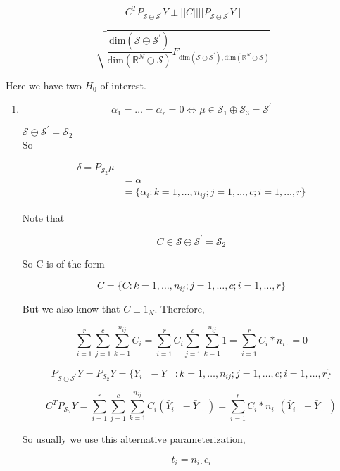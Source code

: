 \documentclass[11pt,fleqn]{book} %
\begin{document}
		$$C^T P_{\mathcal{S} \ominus \mathcal{S}^\prime} Y \pm ||C|| ||P_{\mathcal{S} \ominus \mathcal{S}^\prime}Y|| $$

		$$\sqrt{ \frac{\text{dim}(\mathcal{S} \ominus \mathcal{S}^\prime)}{\text{dim}(\mathbb{R}^N \ominus \mathcal{S})} F_{\text{dim}(\mathcal{S} \ominus \mathcal{S}^\prime), \text{dim}(\mathbb{R}^N \ominus \mathcal{S})} } $$


Here we have two $H_0 $ of interest. 

	\begin{enumerate}[label = \Roman*]
		\item $$\alpha_1 = \dots = \alpha _r = 0 \Leftrightarrow \mu \in \mathcal{S}_1 \oplus \mathcal{S}_3 = \mathcal{S}^\prime$$

		$\mathcal{S} \ominus \mathcal{S}^\prime = \mathcal{S}_2$\\

So 

		\begin{align*}
			\delta = P_{\mathcal{S}_2}\mu\\
				&= \alpha \\
				&= \{\alpha_i: k = 1, \dots, n_{ij}; j = 1, \dots, c; i = 1, \dots, r \}
		\end{align*}


Note that

		$$C \in \mathcal{S} \ominus \mathcal{S}^\prime = \mathcal{S}_2 $$

So C is of the form

		$$C = \{C: k = 1, \dots, n_{ij}; j = 1, \dots, c; i = 1, \dots, r \} $$

But we also know that $C \perp 1_N$. Therefore, 


		$$\displaystyle \sum^r_{i=1} \sum^c_{j=1} \sum^{n_{ij}}_{k=1}  C_i =\displaystyle \sum^r_{i=1} C_i \sum^c_{j=1} \sum^{n_{ij}}_{k=1}  1 =  \sum^r_{i=1} C_i * n_{i\cdot} = 0$$

		$$P_{\mathcal{S} \ominus \mathcal{S}^\prime} Y =  P_{\mathcal{S}_2} Y = \{\bar{Y}_{i\cdot \cdot} - \bar{Y}_{\cdot \cdot \cdot}: k = 1, \dots, n_{ij}; j = 1, \dots, c; i = 1, \dots, r  \}$$ 


		$$C^T P_{\mathcal{S}_2}Y = \displaystyle \sum^r_{i=1} \sum^c_{j=1} \sum^{n_{ij}}_{k=1}  C_i (\bar{Y}_{i\cdot \cdot} - \bar{Y}_{\cdot \cdot \cdot})  =\sum^r_{i=1} C_i * n_{i\cdot} (\bar{Y}_{i\cdot \cdot} - \bar{Y}_{\cdot \cdot \cdot}) $$

So usually we use this alternative parameterization, 

		$$t_i = n_{i\cdot} c_i$$



\end{enumerate}
\end{document}
